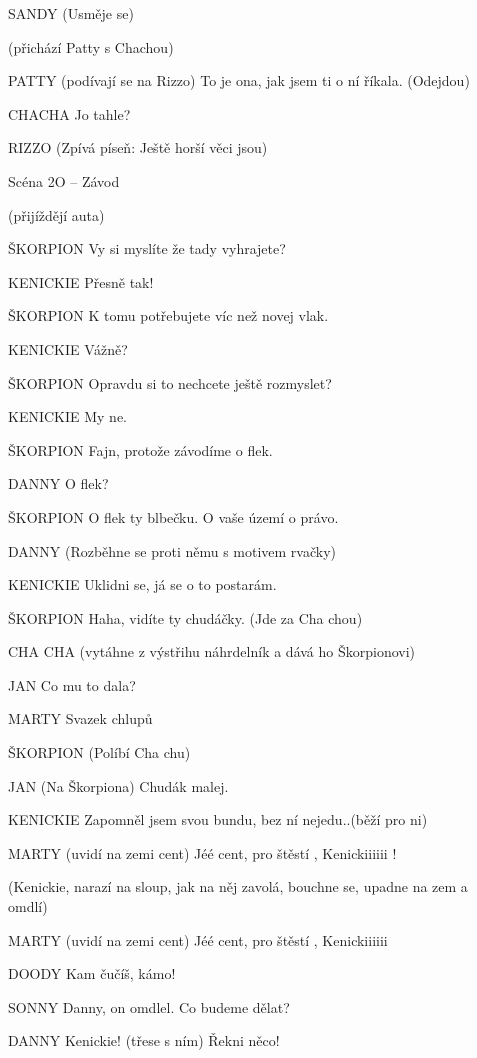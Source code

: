 SANDY        (Usměje se) 

(přichází Patty s Chachou) 

PATTY        (podívají se na Rizzo) To je ona, jak jsem ti o ní říkala. (Odejdou)

CHACHA            Jo tahle?

RIZZO        (Zpívá píseň: Ještě horší věci jsou) 

Scéna 2O  – Závod 

(přijíždějí auta) 

ŠKORPION        Vy si myslíte že tady vyhrajete?

KENICKIE        Přesně tak! 

ŠKORPION        K tomu potřebujete víc než novej vlak. 

KENICKIE        Vážně?

ŠKORPION        Opravdu si to nechcete ještě rozmyslet?

KENICKIE        My ne.

ŠKORPION        Fajn, protože závodíme o flek. 

DANNY        O flek? 

ŠKORPION        O flek ty blbečku. O vaše území o právo. 

DANNY        (Rozběhne se proti němu s motivem rvačky) 

KENICKIE        Uklidni se, já se o to postarám. 

ŠKORPION        Haha, vidíte ty chudáčky. (Jde za Cha chou) 

CHA CHA        (vytáhne z výstřihu náhrdelník a dává ho Škorpionovi)

JAN        Co mu to dala?

MARTY        Svazek chlupů

ŠKORPION        (Políbí Cha chu)

JAN        (Na Škorpiona) Chudák malej. 

KENICKIE            Zapomněl jsem svou bundu, bez ní nejedu..(běží pro ni)

MARTY (uvidí na zemi cent)  Jéé cent,  pro štěstí , Kenickiiiiii !

(Kenickie, narazí na sloup, jak na něj zavolá, bouchne se, upadne na zem a omdlí)

MARTY (uvidí na zemi cent)  Jéé cent,  pro štěstí , Kenickiiiiii

DOODY        Kam čučíš, kámo!

SONNY        Danny,  on omdlel. Co budeme dělat? 

DANNY        Kenickie! (třese s ním) Řekni něco!

